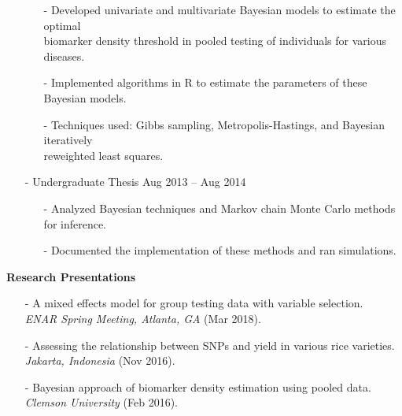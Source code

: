 \documentclass[10pt]{article}
\begin{document}
\begin{itemize}
\begin{itemize}
\vspace{-0.25cm}

\item[-] Developed univariate and multivariate Bayesian models to estimate the optimal \\ biomarker density threshold in pooled testing of individuals for various diseases.

\vspace{-0.05cm}

\item[-] Implemented algorithms in R to estimate the parameters of these Bayesian models.

\vspace{-0.05cm}

\item[-] Techniques used: Gibbs sampling, Metropolis-Hastings, and Bayesian iteratively \\ reweighted least squares.
\end{itemize}
\item[-] Undergraduate Thesis \hfill Aug 2013 -- Aug 2014
\begin{itemize}

\vspace{-0.25cm}

\item[-] Analyzed Bayesian techniques and Markov chain Monte Carlo methods for inference.

\vspace{-0.05cm}

\item[-] Documented the implementation of these methods and ran simulations.
\end{itemize}
\end{itemize}

\noindent
\textbf{Research Presentations}
\begin{itemize}
\item[-] A mixed effects model for group testing data with variable selection. \\
\emph{ENAR Spring Meeting, Atlanta, GA} (Mar 2018).
\item[-] Assessing the relationship between SNPs and yield in various rice varieties. \\
\emph{Jakarta, Indonesia} (Nov 2016).
\item[-] Bayesian approach of biomarker density estimation using pooled data. \\
\emph{Clemson University} (Feb 2016).
\end{itemize}
\end{document}
